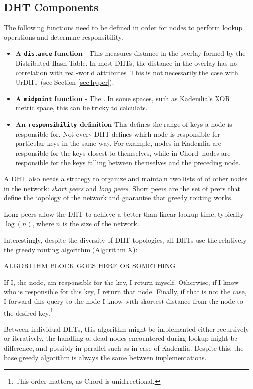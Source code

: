 \documentclass[11pt,conference]{IEEEtran}
\begin{document}
\subsection{DHT Components}
The following functions need to be defined in order for nodes to perform lookup operations and determine responsibility.
\begin{itemize}
	\item \textbf{A \texttt{distance} function } - 
	This measures distance in the overlay formed by the Distributed Hash Table.
	In most DHTs, the distance in the overlay has no correlation with real-world attributes.
	This is not necessarily the case with UrDHT (see Section \ref{sec:hyper}).
	
	\item \textbf{A \texttt{midpoint} function} - The .
	In some spaces, such as Kademlia's XOR metric space, this can be tricky to calculate.  %
	\item \textbf{An \texttt{responsibility} definition}  This defines the range of keys a node is responsible for. 
	Not every DHT defines which node is responsible for particular keys in the same way. 
	For example, nodes in Kademlia are responsible for the keys closest to themselves, while in Chord, nodes are responsible for the keys falling between themselves and the preceding node.
\end{itemize}


A DHT also needs a strategy to organize and maintain two lists of of other nodes in the network: \textit{short peers} and \textit{long peers}.
Short peers are the set of peers that define the topology of the network and guarantee that greedy routing works.

Long peers allow the DHT to achieve a better than linear lookup time, typically $ \log(n) $, where $n$ is the size of the network. 

Interestingly, despite the diversity of DHT topologies, all DHTs use the relatively the greedy routing algorithm (Algorithm X):

ALGORITHM BLOCK GOES HERE OR SOMETHING

If I, the node, am responsible for the key, I return myself.
Otherwise, if I know who is responsible for this key, I return that node.
Finally, if that is not the case, I forward this query to the node I know with shortest distance from the node to the desired key.\footnote{This order matters, as Chord is unidirectional.} 

Between individual DHTs, this algorithm might be implemented either recursively or iteratively, the handling of dead nodes encountered during lookup might be difference, and possibly in parallel such as in case of Kademlia.
Despite this, the base greedy algorithm is always the same between implementations.
\end{document}

